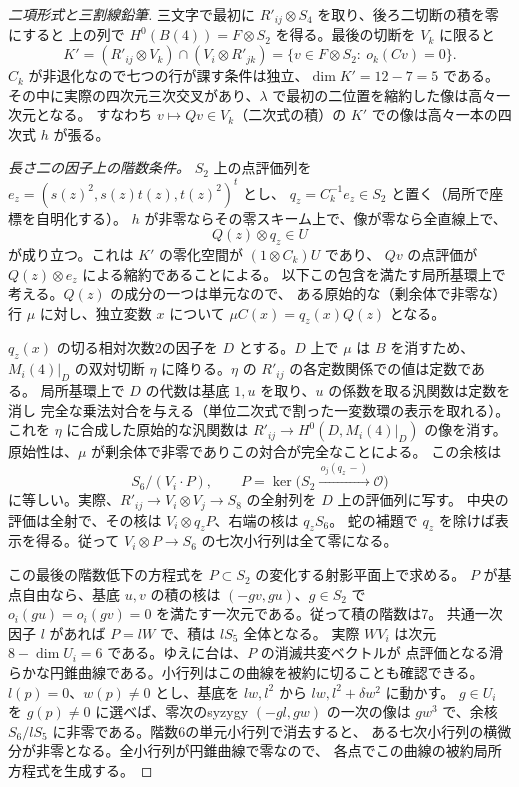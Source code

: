 \begin{proof}[二項形式と三割線鉛筆]
三文字で最初に $R'_{ij}\otimes S_4$ を取り、後ろ二切断の積を零にすると
上の列で $H^0(B(4))=F\otimes S_2$ を得る。最後の切断を $V_k$ に限ると
\[
 K'=(R'_{ij}\otimes V_k)\cap(V_i\otimes R'_{jk})
   =\{v\in F\otimes S_2:\ o_k(Cv)=0\}.
\]
$C_k$ が非退化なので七つの行が課す条件は独立、$\dim K'=12-7=5$ である。
その中に実際の四次元三次交叉があり、$\lambda$ で最初の二位置を縮約した像は高々一次元となる。
すなわち $v\mapsto Qv\in V_k$（二次式の積）の $K'$ での像は高々一本の四次式 $h$ が張る。

\smallskip
\noindent\textit{長さ二の因子上の階数条件。}
$S_2$ 上の点評価列を $e_z=(s(z)^2,s(z)t(z),t(z)^2)^t$ とし、
$q_z=C_k^{-1}e_z\in S_2$ と置く（局所で座標を自明化する）。
$h$ が非零ならその零スキーム上で、像が零なら全直線上で、
\[
                       Q(z)\otimes q_z\in U
\]
が成り立つ。これは $K'$ の零化空間が $(1\otimes C_k)U$ であり、
$Qv$ の点評価が $Q(z)\otimes e_z$ による縮約であることによる。
以下この包含を満たす局所基環上で考える。$Q(z)$ の成分の一つは単元なので、
ある原始的な（剰余体で非零な）行 $\mu$ に対し、独立変数 $x$ について
$\mu C(x)=q_z(x)Q(z)$ となる。

$q_z(x)$ の切る相対次数2の因子を $D$ とする。$D$ 上で $\mu$ は $B$ を消すため、
$M_i(4)|_D$ の双対切断 $\eta$ に降りる。$\eta$ の $R'_{ij}$ の各定数関係での値は定数である。
局所基環上で $D$ の代数は基底 $1,u$ を取り、$u$ の係数を取る汎関数は定数を消し
完全な乗法対合を与える（単位二次式で割った一変数環の表示を取れる）。
これを $\eta$ に合成した原始的な汎関数は $R'_{ij}\to H^0(D,M_i(4)|_D)$ の像を消す。
原始性は、$\mu$ が剰余体で非零でありこの対合が完全なことによる。
この余核は
\[
                  S_6/(V_i\cdot P),\qquad
 P=\ker\bigl(S_2\xrightarrow{\,o_j(q_z\,{-})\,}\mathcal O\bigr)
\]
に等しい。実際、$R'_{ij}\to V_i\otimes V_j\to S_8$ の全射列を $D$ 上の評価列に写す。
中央の評価は全射で、その核は $V_i\otimes q_zP$、右端の核は $q_z S_6$。
蛇の補題で $q_z$ を除けば表示を得る。従って $V_i\otimes P\to S_6$ の七次小行列は全て零になる。

この最後の階数低下の方程式を $P\subset S_2$ の変化する射影平面上で求める。
$P$ が基点自由なら、基底 $u,v$ の積の核は $(-gv,gu)$、$g\in S_2$ で
$o_i(gu)=o_i(gv)=0$ を満たす一次元である。従って積の階数は7。
共通一次因子 $l$ があれば $P=lW$ で、積は $lS_5$ 全体となる。
実際 $W V_i$ は次元 $8-\dim U_i=6$ である。ゆえに台は、$P$ の消滅共変ベクトルが
点評価となる滑らかな円錐曲線である。小行列はこの曲線を被約に切ることも確認できる。
$l(p)=0$、$w(p)\ne0$ とし、基底を $lw,l^2$ から $lw,l^2+\delta w^2$ に動かす。
$g\in U_i$ を $g(p)\ne0$ に選べば、零次のsyzygy $(-gl,gw)$ の一次の像は
$gw^3$ で、余核 $S_6/lS_5$ に非零である。階数6の単元小行列で消去すると、
ある七次小行列の横微分が非零となる。全小行列が円錐曲線で零なので、
各点でこの曲線の被約局所方程式を生成する。


\end{proof}
